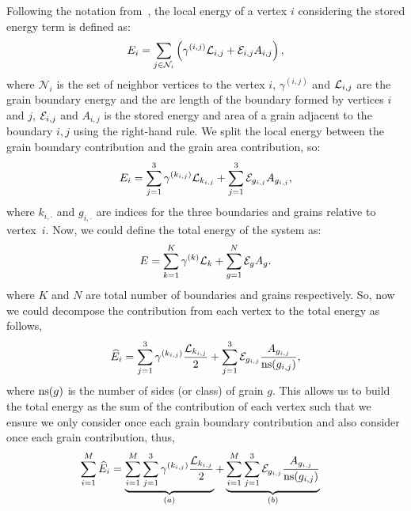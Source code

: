 Following the notation from~\cite{pikekos2008stochastic}, 
the local energy of a vertex $i$ considering the stored energy term is defined as:
 \begin{equation*}
     E_i = \sum_{j \in \mathcal{N}_i}\left(\gamma^{(i,j)}\mathcal{L}_{i,j} + \mathcal{E}_{i,j}A_{i,j}\right),
 \end{equation*}
 where $\mathcal{N}_i$ is the set of neighbor vertices to the vertex $i$, $\gamma^{(i,j)}$ and $\mathcal{L}_{i,j}$ are the grain boundary energy and the arc length of the boundary formed by vertices $i$ and $j$, $\mathcal{E}_{i,j}$ and $A_{i,j}$ is the stored energy and area of a grain adjacent to the boundary $i,j$ using the right-hand rule.  We split the local energy between the grain boundary contribution and the grain area contribution, so:
 \begin{equation*}
     E_i = \sum_{j=1}^3 \gamma^{(k_{i,j})}\mathcal{L}_{k_{i,j}} + \sum_{j=1}^3 \mathcal{E}_{g_{i,j}}A_{g_{i,j}},
 \end{equation*}
 where $k_{i,\cdot}$ and $g_{i,\cdot}$ are indices for the three boundaries and grains relative to vertex~$i$. Now, we could define the total energy of the system as:
 \begin{equation}
     E = \sum_{k = 1}^{K} \gamma^{(k)}\mathcal{L}_{k} + 
     \sum_{g = 1}^{N} \mathcal{E}_{g}A_{g}.
     \label{eq:SEtotalenergy}
 \end{equation}
%
 where $K$ and $N$ are total number of boundaries and grains respectively. So, now we could decompose the contribution from each vertex to the total energy as follows,
 \begin{equation}
     \widehat{E}_i = \sum_{j=1}^3 \gamma^{(k_{i,j})}\dfrac{\mathcal{L}_{k_{i,j}}}{2} + \sum_{j=1}^3 \mathcal{E}_{g_{i,j}}\dfrac{A_{g_{i,j}}}{\operatorname{ns}(g_{i,j})},
        \label{eq:SEvertexenergy}
 \end{equation}
 where $\operatorname{ns}(g)$ is the number of sides (or class) of grain $g$. This allows us to build the total energy
 as the sum of the contribution of each vertex such that we ensure we only consider once each grain boundary contribution and also consider once each grain contribution, thus,
 \begin{align*}
     \sum_{i=1}^{M} \widehat{E}_i %
      &= \underbrace{\sum_{i = 1}^{M} \sum_{j=1}^3 \gamma^{(k_{i,j})} \frac{\AL_{k_{i,j}}}{2} }_{(a)}
     + \underbrace{\sum_{i = 1}^{M} \sum_{j=1}^3 \SE_{g_{i,j}} \frac{A_{g_{i,j}}}{\ns(g_{i,j})} }_{(b)}
 \end{align*}
